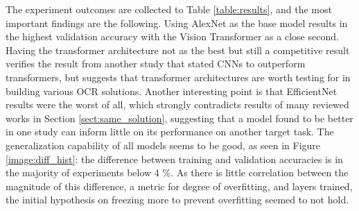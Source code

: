 \documentclass{article}
\begin{document}
The experiment outcomes are collected to Table \ref{table:results}, and 
the most important findings are the following. Using AlexNet as the base model results in the highest 
validation accuracy with the Vision Transformer as a close second. Having the transformer 
architecture not as the best but still a competitive result verifies the result 
from another study that stated CNNs to outperform transformers, but suggests 
that transformer architectures are worth testing for in building various OCR
solutions. Another interesting point is that EfficientNet results were the worst of all, 
which strongly contradicts results of many reviewed works in Section \ref{sect:same_solution},
suggesting that a model found to be better in one study can inform little on its performance on another target task.
The generalization capability of all models seems to be good, as seen in Figure \ref{image:diff_hist}:
the difference between training and validation accuracies is in the majority of 
experiments below 4 \%. As there is little correlation between the magnitude of this difference, 
a metric for degree of overfitting, and layers trained, the initial hypothesis on freezing more to prevent overfitting
seemed to not hold.
\end{document}
